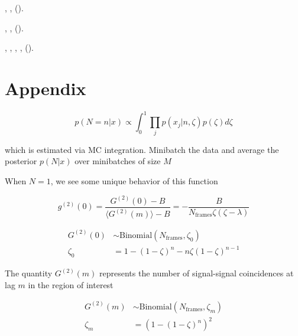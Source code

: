 \documentclass[a4paper, twocolumn, superscriptaddress,prl]{revtex4}  %
\begin{document}
\begin{thebibliography}{31}
 ,
   \textbf{},
   ().

  , 
  \textbf{}, 
  ().

,
  , 
  ,  \textbf{}, 
  ().

\end{thebibliography}


\section{Appendix}

\begin{equation*}
p(N=n|x) \propto \int_{0}^{1} \prod_{j} p(x_{j}|n,\zeta)p(\zeta) d\zeta
\end{equation*}

which is estimated via MC integration. Minibatch the data and average the posterior $p(N|x)$ over minibatches of size $M$


When $N=1$, we see some unique behavior of this function 

\begin{equation*}
g^{(2)}(0) = \frac{G^{(2)}(0)-B}{\langle G^{(2)}(m)\rangle -B} = -\frac{B}{N_{\mathrm{frames}}\zeta(\zeta - \lambda)}
\end{equation*}

\begin{align*}
G^{(2)}(0) &\sim \mathrm{Binomial}(N_{\mathrm{frames}}, \zeta_{0})\\
\zeta_{0} &= 1 - (1-\zeta)^n - n\zeta (1-\zeta)^{n-1}
\end{align*}

The quantity $G^{(2)}(m)$ represents the number of signal-signal coincidences at lag $m$ in the region of interest

\begin{align*}
G^{(2)}(m) &\sim \mathrm{Binomial}(N_{\mathrm{frames}}, \zeta_{m})\\
\zeta_{m} &= (1 - (1-\zeta)^n)^2
\end{align*}
\end{document}
